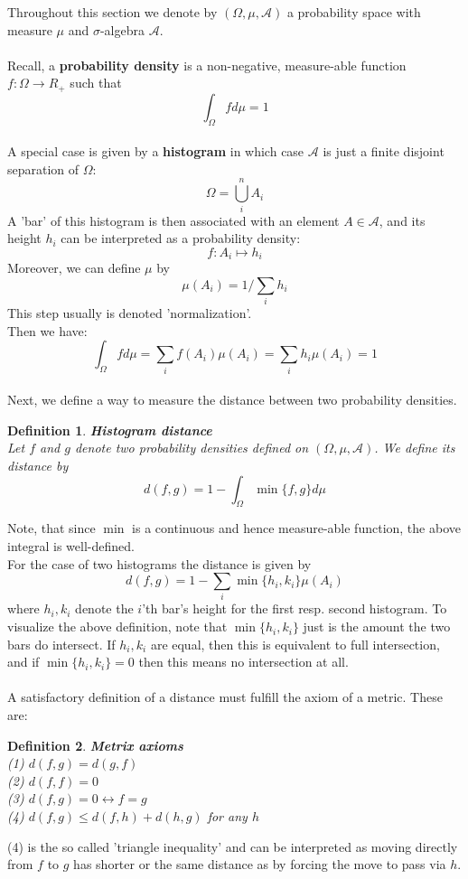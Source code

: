 \documentclass[17pt]{extarticle}
\newtheorem*{definition*}{Definition}
\begin{document}
	Throughout this section we denote by $(\Omega, \mu, \mathcal{A})$ a probability space with measure $\mu$ and $\sigma$-algebra $\mathcal{A}$.\\ \\	
	Recall, a \textbf{probability density} is a non-negative, measure-able function $f:\Omega\rightarrow R_{+}$
	such that
	$$\int_{\Omega}f d\mu=1$$\\
	A special case is given by a \textbf{histogram} in which case $\mathcal{A}$ is just a finite disjoint separation of $\Omega$: 
	$$\Omega=\bigcup_i^n A_i$$
	A 'bar' of this histogram is then associated with an element $A\in\mathcal{A}$, and its height $h_i$ can be interpreted as a probability density:
	$$f:A_i\mapsto h_i$$
	Moreover, we can define $\mu$ by
	$$\mu(A_i)=1/\sum_i h_i$$
	This step usually is denoted 'normalization'.\\
	Then we have:	
	$$\int_{\Omega}f d\mu=\sum_i f(A_i)\mu(A_i)=\sum_i h_i\mu(A_i)=1$$\\
	Next, we define a way to measure the distance between two probability densities.
\begin{definition*}
	\textbf{Histogram distance}\\
	Let $f$ and $g$ denote two probability densities defined on $(\Omega, \mu, \mathcal{A})$.
	We define its distance by
	$$d(f,g)=1-\int_{\Omega}\min\{f,g\}d\mu$$
\end{definition*}
Note, that since $\min$ is a continuous and hence measure-able function, the above integral is well-defined.\\
For the case of two histograms the distance is given by
$$d(f,g)=1-\sum_i \min\{h_i, k_i\} \mu(A_i)$$
where $h_i, k_i$ denote the $i$'th bar's height for the first resp. second histogram.
To visualize the above definition, note that $\min\{h_i, k_i\}$ just is the amount the two bars do intersect.
If $h_i, k_i$ are equal, then this is equivalent to full intersection, and if $\min\{h_i, k_i\}=0$ then this means no intersection at all.\\ \\
A satisfactory definition of a distance must fulfill the axiom of a metric. These are:
\begin{definition*}
\textbf{Metrix axioms}\\
(1) $d(f,g)=d(g,f)$\\
(2) $d(f,f)=0$\\
(3) $d(f,g)=0 \leftrightarrow f=g$\\
(4) $d(f,g)\leq d(f,h)+d(h,g)$ for any $h$
\end{definition*}
(4) is the so called 'triangle inequality' and can be interpreted as moving directly from
$f$ to $g$ has shorter or the same distance as by forcing the move to pass via $h$.\\
\end{document}
